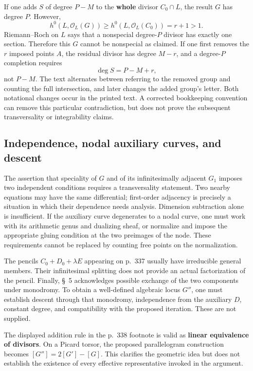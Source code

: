 If one adds \(S\) of degree \(P-M\) to the \textbf{whole} divisor \(C_0\cap L\), the result \(G\) has degree \(P\). However,
\[
h^0(L,\mathcal O_L(G))
\geq h^0(L,\mathcal O_L(C_0))=r+1>1.
\]
Riemann--Roch on \(L\) says that a nonspecial degree-\(P\) divisor has exactly one section. Therefore this \(G\) cannot be nonspecial as claimed. If one first removes the \(r\) imposed points \(A\), the residual divisor has degree \(M-r\), and a degree-\(P\) completion requires
\[
\deg S=P-M+r,
\]
not \(P-M\). The text alternates between referring to the removed group and counting the full intersection, and later changes the added group's letter. Both notational changes occur in the printed text. A corrected bookkeeping convention can remove this particular contradiction, but does not prove the subsequent transversality or integrability claims.

\subsection{Independence, nodal auxiliary curves, and descent}\label{cp2-ix-5-4}

The assertion that speciality of \(G\) and of its infinitesimally adjacent \(G_1\) imposes two independent conditions requires a transversality statement. Two nearby equations may have the same differential; first-order adjacency is precisely a situation in which their dependence needs analysis. Dimension subtraction alone is insufficient. If the auxiliary curve degenerates to a nodal curve, one must work with its arithmetic genus and dualizing sheaf, or normalize and impose the appropriate gluing condition at the two preimages of the node. These requirements cannot be replaced by counting free points on the normalization.

The pencils \(C_0+D_0+\lambda E\) appearing on p.~337 usually have irreducible general members. Their infinitesimal splitting does not provide an actual factorization of the pencil. Finally, \S~5 acknowledges possible exchange of the two components under monodromy. To obtain a well-defined algebraic locus \(G''\), one must establish descent through that monodromy, independence from the auxiliary \(D\), constant degree, and compatibility with the proposed iteration. These are not supplied.

The displayed addition rule in the p.~338 footnote is valid as \textbf{linear equivalence of divisors}. On a Picard torsor, the proposed parallelogram construction becomes \([G'']=2[G']-[G]\). This clarifies the geometric idea but does not establish the existence of every effective representative invoked in the argument.

